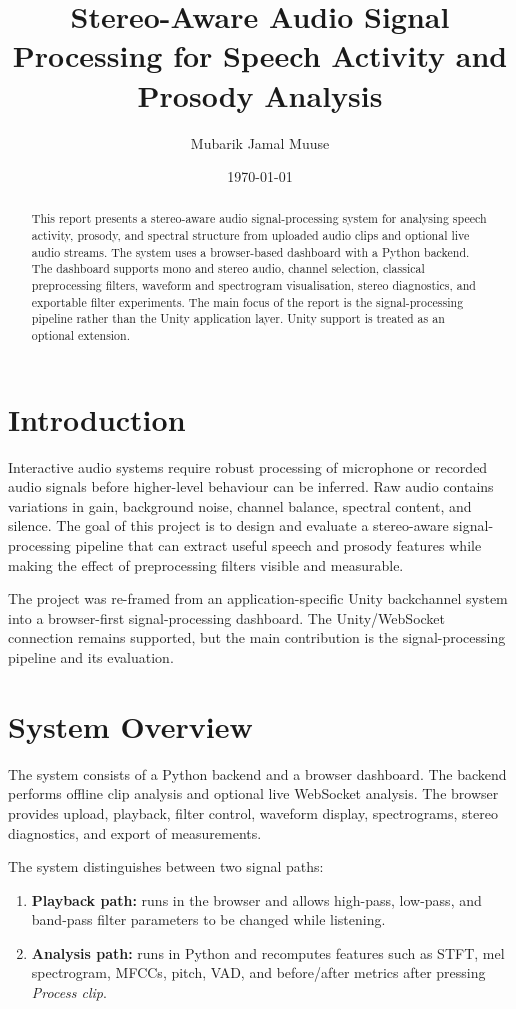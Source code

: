 \documentclass[11pt,a4paper]{article}
\title{Stereo-Aware Audio Signal Processing for Speech Activity and Prosody Analysis}
\author{Mubarik Jamal Muuse}
\date{\today}
\begin{document}
\maketitle

\begin{abstract}
This report presents a stereo-aware audio signal-processing system for analysing speech activity, prosody, and spectral structure from uploaded audio clips and optional live audio streams. The system uses a browser-based dashboard with a Python backend. The dashboard supports mono and stereo audio, channel selection, classical preprocessing filters, waveform and spectrogram visualisation, stereo diagnostics, and exportable filter experiments. The main focus of the report is the signal-processing pipeline rather than the Unity application layer. Unity support is treated as an optional extension.
\end{abstract}

\section{Introduction}
Interactive audio systems require robust processing of microphone or recorded audio signals before higher-level behaviour can be inferred. Raw audio contains variations in gain, background noise, channel balance, spectral content, and silence. The goal of this project is to design and evaluate a stereo-aware signal-processing pipeline that can extract useful speech and prosody features while making the effect of preprocessing filters visible and measurable.

The project was re-framed from an application-specific Unity backchannel system into a browser-first signal-processing dashboard. The Unity/WebSocket connection remains supported, but the main contribution is the signal-processing pipeline and its evaluation.

\section{System Overview}
The system consists of a Python backend and a browser dashboard. The backend performs offline clip analysis and optional live WebSocket analysis. The browser provides upload, playback, filter control, waveform display, spectrograms, stereo diagnostics, and export of measurements.

The system distinguishes between two signal paths:
\begin{enumerate}
    \item \textbf{Playback path:} runs in the browser and allows high-pass, low-pass, and band-pass filter parameters to be changed while listening.
    \item \textbf{Analysis path:} runs in Python and recomputes features such as STFT, mel spectrogram, MFCCs, pitch, VAD, and before/after metrics after pressing \emph{Process clip}.
\end{enumerate}
\end{document}
